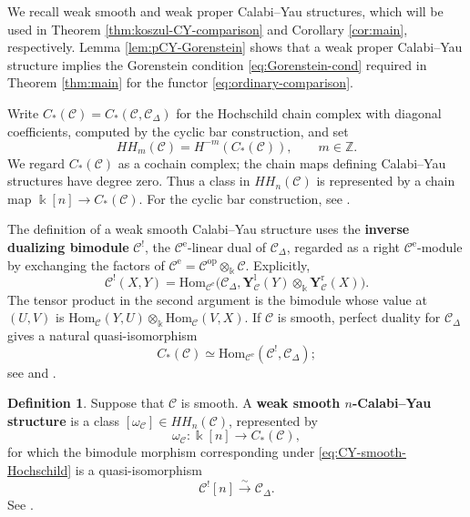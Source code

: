 \documentclass[11pt,letterpaper,reqno]{amsart}
\theoremstyle{plain}
\theoremstyle{definition}
\newtheorem{definition}[definition]{Definition}
\theoremstyle{plain}
\theoremstyle{definition}
\numberwithin{equation}{section}
\begin{document}
We recall weak smooth and weak proper Calabi--Yau structures, which will be used in Theorem \ref{thm:koszul-CY-comparison} and Corollary \ref{cor:main}, respectively.
Lemma \ref{lem:pCY-Gorenstein} shows that a weak proper Calabi--Yau structure implies the Gorenstein condition \eqref{eq:Gorenstein-cond} required in Theorem \ref{thm:main} for the functor \eqref{eq:ordinary-comparison}.

Write $C_*(\mathscr C)=C_*(\mathscr C,\mathscr C_\Delta)$ for the Hochschild chain complex with diagonal coefficients, computed by the cyclic bar construction, and set
\[
HH_m(\mathscr C)=H^{-m}(C_*(\mathscr C)),\qquad m\in\mathbb Z.
\]
We regard $C_*(\mathscr C)$ as a cochain complex; the chain maps defining Calabi--Yau structures have degree zero.
Thus a class in $HH_n(\mathscr C)$ is represented by a chain map $\Bbbk[n]\to C_*(\mathscr C)$.
For the cyclic bar construction, see \cite[Section 2.4]{Gao2025}.

The definition of a weak smooth Calabi--Yau structure uses the \textbf{inverse dualizing bimodule} $\mathscr C^!$, the $\mathscr C^{\mathrm e}$-linear dual of $\mathscr C_\Delta$, regarded as a right $\mathscr C^{\mathrm e}$-module by exchanging the factors of $\mathscr C^{\mathrm e}=\mathscr C^{\mathrm{op}}\otimes_{\Bbbk}\mathscr C$.
Explicitly,
\[
\mathscr C^!(X,Y)=\mathrm{Hom}_{\mathscr C^{\mathrm e}}
\bigl(\mathscr C_\Delta,
\mathbf Y_{\mathscr C}^{\mathrm l}(Y)\otimes_{\Bbbk}\mathbf Y_{\mathscr C}^{\mathrm r}(X)\bigr).
\]
The tensor product in the second argument is the bimodule whose value at $(U,V)$ is $\mathrm{Hom}_{\mathscr C}(Y,U)\otimes_{\Bbbk}\mathrm{Hom}_{\mathscr C}(V,X)$.
If $\mathscr C$ is smooth, perfect duality for $\mathscr C_\Delta$ gives a natural quasi-isomorphism
\begin{equation}\label{eq:CY-smooth-Hochschild}
C_*(\mathscr C)\simeq\mathrm{Hom}_{\mathscr C^{\mathrm e}}(\mathscr C^!,\mathscr C_\Delta);
\end{equation}
see \cite[Section 3.2]{Brav-Dyckerhoff2019} and \cite[Remark 6.7]{Ganatra2023}.

\begin{definition}\label{def:weak-smooth-CY}
Suppose that $\mathscr C$ is smooth.
A \textbf{weak smooth $n$-Calabi--Yau structure} is a class $[\omega_{\mathscr C}]\in HH_n(\mathscr C)$, represented by
\begin{equation}\label{eq:sCY-volume}
\omega_{\mathscr C}:\Bbbk[n]\longrightarrow C_*(\mathscr C),
\end{equation}
for which the bimodule morphism corresponding under \eqref{eq:CY-smooth-Hochschild} is a quasi-isomorphism
\begin{equation}\label{eq:sCY-map}
\mathscr C^![n]\xrightarrow{\,\sim\,}\mathscr C_\Delta.
\end{equation}
See \cite[Definition 6.5 and Remark 6.7]{Ganatra2023}.
\end{definition}
\end{document}
